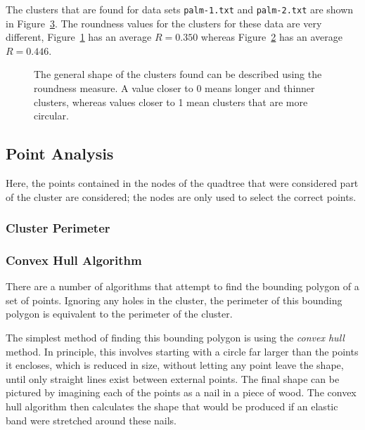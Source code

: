 The clusters that are found for data sets \texttt{palm-1.txt} and
\texttt{palm-2.txt} are shown in Figure~\ref{fig:roundness}. The roundness
values for the clusters for these data are very different,
Figure~\ref{fig:roundness-long.png} has an average $R=0.350$ whereas
Figure~\ref{fig:roundness-round.png} has an average $R=0.446$.

\begin{figure}[tbhp]
	\centering
	\begin{subfigure}[b]{4.2cm}
		\caption{}\label{fig:roundness-long.png}
	\end{subfigure}%
	\quad
	\begin{subfigure}[b]{4.2cm}
		\caption{}\label{fig:roundness-round.png}
	\end{subfigure}

	\caption[A comparison of roundness values.]{The general shape of the
		clusters found can be described using the roundness measure. A value
		closer to 0 means longer and thinner clusters, whereas values closer to
		1 mean clusters that are more circular.}\label{fig:roundness}
\end{figure}

\subsection{Point Analysis}
\label{sub:point_analysis}

Here, the points contained in the nodes of the quadtree that were considered
part of the cluster are considered; the nodes are only used to select the
correct points.

\subsubsection{Cluster Perimeter}
\label{ssub:cluster_perimeter_point}

\subsubsection*{Convex Hull Algorithm}
\label{ssub:Convex Hull Algorithm}

There are a number of algorithms that attempt to find the bounding polygon of a
set of points. Ignoring any holes in the cluster, the perimeter of this
bounding polygon is equivalent to the perimeter of the cluster.

The simplest method of finding this bounding polygon is using the \emph{convex
hull} method\cite{barber1996quickhull}. In principle, this involves starting
with a circle far larger than the points it encloses, which is reduced in size,
without letting any point leave the shape, until only straight lines exist
between external points. The final shape can be pictured by imagining each of
the points as a nail in a piece of wood. The convex hull algorithm then
calculates the shape that would be produced if an elastic band were stretched
around these nails.

